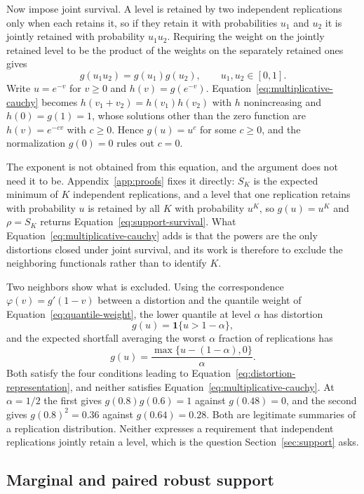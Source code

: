 \documentclass[11pt]{article}
\theoremstyle{remark}
\begin{document}
Now impose joint survival. A level is retained by two independent replications only when each retains it, so if they retain it with probabilities $u_1$ and $u_2$ it is jointly retained with probability $u_1u_2$. Requiring the weight on the jointly retained level to be the product of the weights on the separately retained ones gives
\begin{equation}
g(u_1u_2)=g(u_1)g(u_2),
\qquad
u_1,u_2\in[0,1].
\label{eq:multiplicative-cauchy}
\end{equation}
Write $u=e^{-v}$ for $v\geq0$ and $h(v)=g(e^{-v})$. Equation~\eqref{eq:multiplicative-cauchy} becomes $h(v_1+v_2)=h(v_1)h(v_2)$ with $h$ nonincreasing and $h(0)=g(1)=1$, whose solutions other than the zero function are $h(v)=e^{-cv}$ with $c\geq0$. Hence $g(u)=u^{c}$ for some $c\geq0$, and the normalization $g(0)=0$ rules out $c=0$.

The exponent is not obtained from this equation, and the argument does not need it to be. Appendix~\ref{app:proofs} fixes it directly: $S_K$ is the expected minimum of $K$ independent replications, and a level that one replication retains with probability $u$ is retained by all $K$ with probability $u^{K}$, so $g(u)=u^{K}$ and $\rho=S_K$ returns Equation~\eqref{eq:support-survival}. What Equation~\eqref{eq:multiplicative-cauchy} adds is that the powers are the only distortions closed under joint survival, and its work is therefore to exclude the neighboring functionals rather than to identify $K$.

Two neighbors show what is excluded. Using the correspondence $\varphi(v)=g'(1-v)$ between a distortion and the quantile weight of Equation~\eqref{eq:quantile-weight}, the lower quantile at level $\alpha$ has distortion
\[
g(u)=\mathbf{1}\{u>1-\alpha\},
\]
and the expected shortfall averaging the worst $\alpha$ fraction of replications has
\[
g(u)=\frac{\max\{u-(1-\alpha),0\}}{\alpha}.
\]
Both satisfy the four conditions leading to Equation~\eqref{eq:distortion-representation}, and neither satisfies Equation~\eqref{eq:multiplicative-cauchy}. At $\alpha=1/2$ the first gives $g(0.8)g(0.6)=1$ against $g(0.48)=0$, and the second gives $g(0.8)^2=0.36$ against $g(0.64)=0.28$. Both are legitimate summaries of a replication distribution. Neither expresses a requirement that independent replications jointly retain a level, which is the question Section~\ref{sec:support} asks.

\subsection{Marginal and paired robust support}
\end{document}

